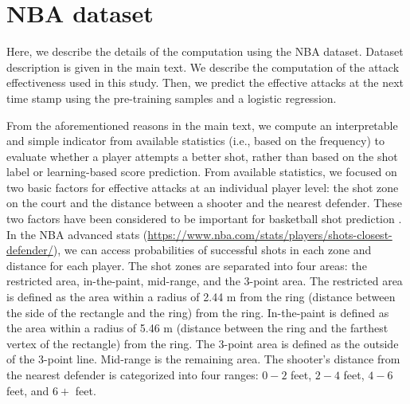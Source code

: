 \documentclass[journal]{IEEEtran}
\begin{document}
\section{NBA dataset}
\label{app:nba}
Here, we describe the details of the computation using the NBA dataset.
Dataset description is given in the main text.
We describe the computation of the attack effectiveness used in this study.
Then, we predict the effective attacks at the next time stamp using the pre-training samples and a logistic regression.  %
%
%
%

%
From the aforementioned reasons in the main text, we compute an interpretable and simple indicator from available statistics (i.e., based on the frequency) to evaluate whether a player attempts a better shot, rather than based on the shot label or learning-based score prediction.
From available statistics, we focused on two basic factors for effective attacks at an individual player level: the shot zone on the court and the distance between a shooter and the nearest defender. 
These two factors have been considered to be important for basketball shot prediction \cite{Fujii16,Fujii17,Fujii18}.
In the NBA advanced stats (\url{https://www.nba.com/stats/players/shots-closest-defender/}), we can access probabilities of successful shots in each zone and distance for each player.
The shot zones are separated into four areas: the restricted area, in-the-paint, mid-range, and the 3-point area. 
The restricted area is defined as the area within a radius of 2.44 m from the ring (distance between the side of the rectangle and the ring) from the ring.
In-the-paint is defined as the area within a radius of 5.46 m (distance between the ring and the farthest vertex of the rectangle) from the ring.
The 3-point area is defined as the outside of the 3-point line. 
Mid-range is the remaining area. 
The shooter's distance from the nearest defender is categorized into four ranges: $0-2$ feet, $2-4$ feet, $4-6$ feet, and $6+$ feet.
\end{document}
